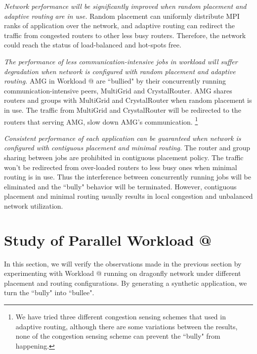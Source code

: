 \documentclass[conference,compsoc]{IEEEtran}
\makeatletter
\newcommand{\Rmnum}[1]{\expandafter\@slowromancap\romannumeral #1@}
\makeatother
\begin{document}
\emph{Network performance will be significantly improved when random placement and adaptive routing are in use.} Random placement can uniformly distribute MPI ranks of application over the network, and adaptive routing can redirect the traffic from congested routers to other less busy routers. Therefore, the network could reach the status of load-balanced and hot-spots free. 

\emph{The performance of less communication-intensive jobs in workload will suffer degradation when network is configured with random placement and adaptive routing.} AMG in Workload \Rmnum{1} are ``bullied" by their concurrently running communication-intensive peers, MultiGrid and CrystalRouter. AMG shares routers and groups with MultiGrid and CrystalRouter when random placement is in use. The traffic from MultiGrid and CrystalRouter will be redirected to the routers that serving AMG, slow down AMG's communication. \footnote{We have tried three different congestion sensing schemes that used in adaptive routing\cite{won-prog-adaptive}, although there are some variations between the results, none of the congestion sensing scheme can prevent the ``bully" from happening.}

\emph{Consistent performance of each application can be guaranteed when network is configured with contiguous placement and minimal routing.} The router and group sharing between jobs are prohibited in contiguous placement policy. The traffic won't be redirected from over-loaded routers to less busy ones when minimal routing is in use. Thus the interference between concurrently running jobs will be eliminated and the ``bully" behavior will be terminated. However, contiguous placement and minimal routing usually results in local congestion and unbalanced network utilization.


\section{Study of Parallel Workload \Rmnum{2 }}
\label{sec:workload-2}

In this section, we will verify the observations made in the previous section by experimenting with Workload \Rmnum{1 } running on dragonfly network under different placement and routing configurations. By generating a synthetic application, we turn the ``bully" into ``bullee". 
\end{document}
